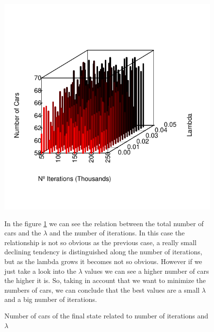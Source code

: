 \documentclass[12]{article}
\begin{document}
    \begin{figure}
    \captionsetup{justification=centering}
   		\centering
        \includegraphics[scale=0.9]{Results/data_B_2.pdf}
        \caption{Number of cars of the final state related to number of iterations and $\lambda$}
        \label{fig:data3}
        
        \vspace{1cm}
In the figure \ref{fig:data3} we can see the relation between the total number of cars and the $\lambda$ and the number of iterations. In this case the relationship is not so  obvious as the previous case, a really small declining tendency is distinguished along the number of iterations, but as the lambda grows it becomes not so obvious. However if we just take a look into the $\lambda$ values we can see a higher number of cars the higher it is. So, taking in account that we want to minimize the numbers of cars, we can conclude that the best values are a small $\lambda$ and a big number of iterations. 
        
        \end{figure}
\end{document}

